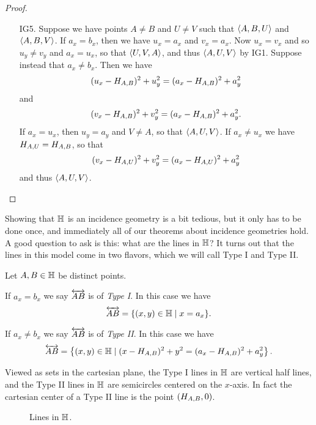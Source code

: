 \begin{proof}
\begin{itemize}
\item[IG5.] Suppose we have points \(A \neq B\) and \(U \neq V\) such that \(\langle A, B, U \rangle\) and \(\langle A, B, V \rangle\).
If \(a_x = b_x\), then we have \(u_x = a_x\) and \(v_x = a_x\).
Now \(u_x = v_x\) and so \(u_y \neq v_y\) and \(a_x = u_x\), so that \(\langle U, V, A \rangle\), and thus \(\langle A, U, V \rangle\) by IG1.
Suppose instead that \(a_x \neq b_x\).
Then we have \[ (u_x - H_{A,B})^2 + u_y^2 = (a_x - H_{A,B})^2 + a_y^2 \] and \[ (v_x - H_{A,B})^2 + v_y^2 = (a_x - H_{A,B})^2 + a_y^2. \]
If \(a_x = u_x\), then \(u_y = a_y\) and \(V \neq A\), so that \(\langle A, U, V \rangle\).
If \(a_x \neq u_x\) we have \(H_{A,U} = H_{A,B}\), so that \[ (v_x - H_{A,U})^2 + v_y^2 = (a_x - H_{A,U})^2 + a_y^2 \] and thus \(\langle A, U, V \rangle\).
\qedhere
\end{itemize}
\end{proof}

Showing that \(\mathbb{H}\) is an incidence geometry is a bit tedious, but it only has to be done once, and immediately all of our theorems about incidence geometries hold.
A good question to ask is this: what are the lines in \(\mathbb{H}\)?
It turns out that the lines in this model come in two flavors, which we will call Type I and Type II.

\begin{cor}
Let \(A, B \in \mathbb{H}\) be distinct points.
\begin{proplist}
\item If \(a_x = b_x\) we say \(\overleftrightarrow{AB}\) is of \emph{Type I}.
In this case we have \[ \overleftrightarrow{AB} = \{ (x,y) \in \mathbb{H} \mid x = a_x \}. \]
\item If \(a_x \neq b_x\) we say \(\overleftrightarrow{AB}\) is of \emph{Type II}.
In this case we have \[ \overleftrightarrow{AB} = \left\{ (x,y) \in \mathbb{H} \mid (x - H_{A,B})^2 + y^2 = (a_x - H_{A,B})^2 + a_y^2 \right\}. \]
\end{proplist}
\end{cor}

Viewed as sets in the cartesian plane, the Type I lines in \(\mathbb{H}\) are vertical half lines, and the Type II lines in \(\mathbb{H}\) are semicircles centered on the \(x\)-axis.
In fact the cartesian center of a Type II line is the point \((H_{A,B},0)\).

\begin{figure}[h]
\begin{center}
\caption{\label{fig:lines-in-hyp-half-plane}Lines in \(\mathbb{H}\).}
\end{center}
\end{figure}



